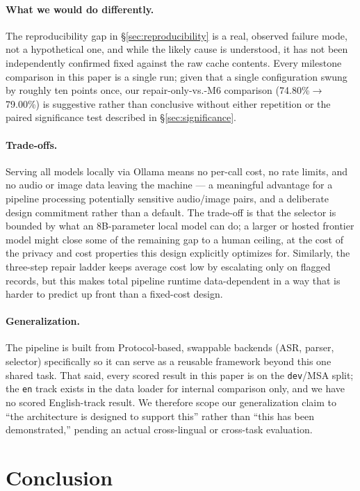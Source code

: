 \documentclass[11pt]{article}
\begin{document}
\paragraph{What we would do differently.} The reproducibility gap in \S\ref{sec:reproducibility} is a real, observed failure mode, not a hypothetical one, and while the likely cause is understood, it has not been independently confirmed fixed against the raw cache contents. Every milestone comparison in this paper is a single run; given that a single configuration swung by roughly ten points once, our repair-only-vs.-M6 comparison (74.80\%$\rightarrow$79.00\%) is suggestive rather than conclusive without either repetition or the paired significance test described in \S\ref{sec:significance}.

\paragraph{Trade-offs.} Serving all models locally via Ollama means no per-call cost, no rate limits, and no audio or image data leaving the machine --- a meaningful advantage for a pipeline processing potentially sensitive audio/image pairs, and a deliberate design commitment rather than a default. The trade-off is that the selector is bounded by what an 8B-parameter local model can do; a larger or hosted frontier model might close some of the remaining gap to a human ceiling, at the cost of the privacy and cost properties this design explicitly optimizes for. Similarly, the three-step repair ladder keeps average cost low by escalating only on flagged records, but this makes total pipeline runtime data-dependent in a way that is harder to predict up front than a fixed-cost design.

\paragraph{Generalization.} The pipeline is built from Protocol-based, swappable backends (ASR, parser, selector) specifically so it can serve as a reusable framework beyond this one shared task. That said, every scored result in this paper is on the \texttt{dev}/MSA split; the \texttt{en} track exists in the data loader for internal comparison only, and we have no scored English-track result. We therefore scope our generalization claim to ``the architecture is designed to support this'' rather than ``this has been demonstrated,'' pending an actual cross-lingual or cross-task evaluation.

\section{Conclusion}
\label{sec:conclusion}
\end{document}
